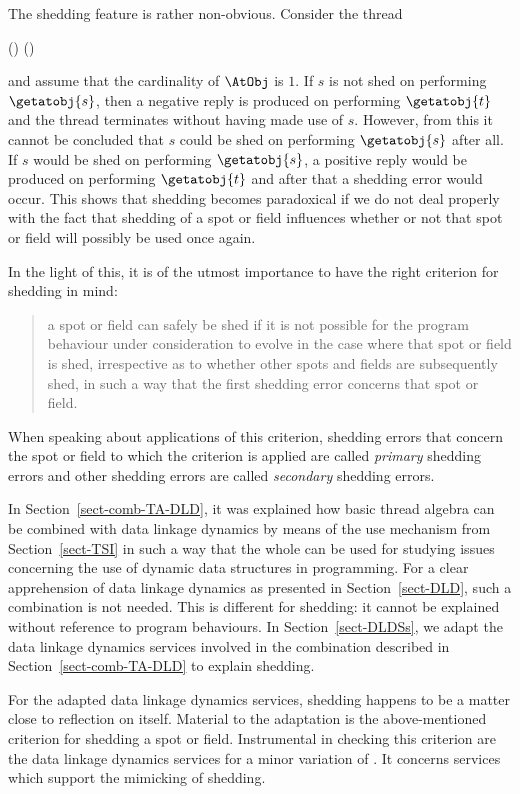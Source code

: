 \documentclass[fleqn]{llncs}
\begin{document}
The shedding feature is rather non-obvious.
Consider the thread
\begin{ldispl}
\dld() \bapf
()
\end{ldispl}and assume that the cardinality of $\AtObj$ is $1$.
If $s$ is not shed on performing $\getatobj{s}$, then a negative reply
is produced on performing $\getatobj{t}$ and the thread terminates
without having made use of $s$.
However, from this it cannot be concluded that $s$ could be shed on
performing $\getatobj{s}$ after all.
If $s$ would be shed on performing $\getatobj{s}$, a positive reply
would be produced on performing $\getatobj{t}$ and after that a shedding
error would occur.
This shows that shedding becomes paradoxical if we do not deal properly
with the fact that shedding of a spot or field influences whether or not
that spot or field will possibly be used once again.

In the light of this, it is of the utmost importance to have the right
criterion for shedding in mind:
\begin{quote}
a spot or field can safely be shed if it is not possible for the program
behaviour under consideration to evolve in the case where that spot or
field is shed, irrespective as to whether other spots and fields are
subsequently shed, in such a way that the first shedding error concerns
that spot or field.
\end{quote}
When speaking about applications of this criterion, shedding errors that
concern the spot or field to which the criterion is applied are called
\emph{primary} shedding errors and other shedding errors are called
\emph{secondary} shedding errors.

In Section~\ref{sect-comb-TA-DLD}, it was explained how basic thread
algebra can be combined with data linkage dynamics by means of the use
mechanism from Section~\ref{sect-TSI} in such a way that the whole can
be used for studying issues concerning the use of dynamic data
structures in programming.
For a clear apprehension of data linkage dynamics as presented in
Section~\ref{sect-DLD}, such a combination is not needed.
This is different for shedding: it cannot be explained without reference
to program behaviours.
In Section~\ref{sect-DLDSs}, we adapt the data linkage dynamics services
involved in the combination described in Section~\ref{sect-comb-TA-DLD}
to explain shedding.

For the adapted data linkage dynamics services, shedding happens to be a
matter close to reflection on itself.
Material to the adaptation is the above-mentioned criterion for shedding
a spot or field.
Instrumental in checking this criterion are the data linkage dynamics
services for a minor variation of \DLD.
It concerns services which support the mimicking of shedding.
\end{document}
